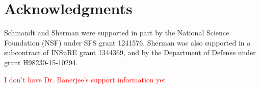 \section{Acknowledgments}


Schmandt and Sherman were supported in part by the National Science Foundation (NSF) under SFS grant 1241576. Sherman was also supported in a subcontract of INSuRE grant 1344369, and by the Department of Defense under grant H98230-15-10294.

\textcolor{red}{I don't have Dr. Banerjee's support information yet}